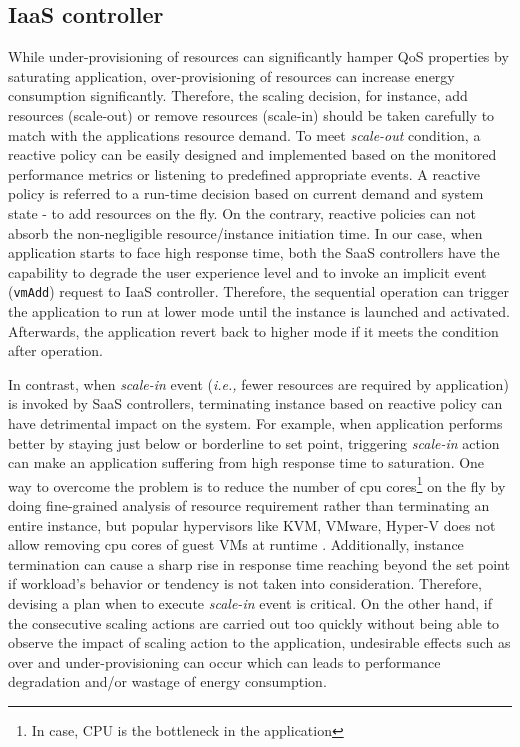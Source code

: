 \subsection{IaaS controller}


While under-provisioning of resources can significantly hamper QoS properties by saturating application, over-provisioning of resources can increase energy consumption significantly. Therefore, the scaling decision, for instance, add resources (scale-out) or remove resources (scale-in) should be taken carefully to match with the applications resource demand. To meet \emph{scale-out} condition, a reactive policy can be easily designed and implemented based on the monitored performance metrics or listening to predefined appropriate events. A reactive policy is referred to a run-time decision based on current demand and system state - to add resources on the fly. On the contrary, reactive policies can not absorb the non-negligible resource/instance initiation time. In our case, when application starts to face high response time, both the SaaS controllers have the capability to degrade the user experience level and to invoke an implicit event (\texttt{vmAdd}) request to IaaS controller. Therefore, the sequential operation can trigger the application to run at lower mode until the instance is launched and activated. Afterwards, the application revert back to higher mode if it meets the condition after operation.

In contrast, when \emph{scale-in} event (\emph{i.e.,} fewer resources are required by application) is invoked by SaaS controllers, terminating instance based on reactive policy can have detrimental impact on the system. For example, when application performs better by staying just below or borderline to set point, triggering \emph{scale-in} action can make an application suffering from high response time to saturation. One way to overcome the problem is to reduce the number of cpu cores\footnote{In case, CPU is the bottleneck in the application} on the fly by doing fine-grained analysis of resource requirement rather than terminating an entire instance, but popular hypervisors like KVM, VMware, Hyper-V does not allow removing cpu cores of guest VMs at runtime \cite{vertical}.
Additionally, instance termination can cause a sharp rise in response time reaching beyond the set point if workload's behavior or tendency is not taken into consideration. Therefore, devising a plan when to execute \emph{scale-in} event is critical. On the other hand, if the consecutive scaling actions are carried out too quickly without being able to observe the impact of scaling action to the application, undesirable effects such as over and under-provisioning can occur which can leads to performance degradation and/or wastage of energy consumption.
  
